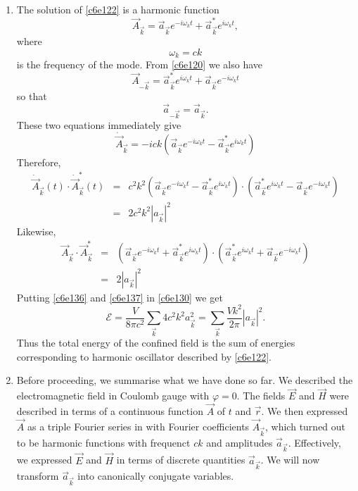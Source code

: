 \begin{enumerate}
\item The solution of \eqref{c6e122} is a harmonic function
\begin{equation}\label{c6e131}
\vec{A}_\vec{k} = \vec{a}_\vec{k}e^{-i\omega_k t} + \vec{a}_\vec{k}^\ast e^{i\omega_k t},
\end{equation}
where
\begin{equation}\label{c6e132}
\omega_k = ck
\end{equation}
is the frequency of the mode. From \eqref{c6e120} we also have
\begin{equation}\label{c6e133}
\vec{A}_{-\vec{k}} = \vec{a}_\vec{k}^\ast e^{i\omega_k t} + \vec{a}_\vec{k} e^{-i\omega_k t}
\end{equation}
so that
\begin{equation}\label{c6e134}
\vec{a}_{-\vec{k}} = \vec{a}_\vec{k}.
\end{equation}
These two equations immediately give
\begin{equation}\label{c6e135}
\dot{\vec{A}}_\vec{k} = -ick(\vec{a}_\vec{k}e^{-i\omega_k t} - \vec{a}_\vec{k}^\ast e^{i\omega_k t})
\end{equation}
Therefore,
\begin{eqnarray}
\dot{\vec{A}}_\vec{k}(t)\cdot\dot{\vec{A}}_{\vec{k}}^\ast(t) &=& c^2k^2
(\vec{a}_\vec{k}e^{-i\omega_k t} - \vec{a}_\vec{k}^\ast e^{i\omega_k t})\cdot
(\vec{a}_\vec{k}^\ast e^{i\omega_k t} - \vec{a}_\vec{k} e^{-i\omega_k t}) \nonumber \\
&=& 2c^2k^2|a_\vec{k}|^2 \label{c6e136}
\end{eqnarray}
Likewise,
\begin{eqnarray}
\vec{A}_\vec{k}\cdot\vec{A}_\vec{k}^\ast &=& 
(\vec{a}_\vec{k}e^{-i\omega_k t} + \vec{a}_\vec{k}^\ast e^{i\omega_k t})\cdot
(\vec{a}_\vec{k}^\ast e^{i\omega_k t} + \vec{a}_\vec{k} e^{-i\omega_k t}) \nonumber \\
&=& 2|a_\vec{k}|^2 \label{c6e137}
\end{eqnarray}
Putting \eqref{c6e136} and \eqref{c6e137} in \eqref{c6e130} we get
\begin{equation}\label{c6e138}
\mathcal{E} = \frac{V}{8\pi c^2}\sum_{\vec{k}} 4c^2k^2 a^2_\vec{k}
= \sum_{\vec{k}} \frac{Vk^2}{2\pi}|a_\vec{k}|^2.
\end{equation}
Thus the total energy of the confined field is the sum of energies corresponding
to harmonic oscillator described by \eqref{c6e122}.

\item Before proceeding, we summarise what we have done so far. We described the
electromagnetic field in Coulomb gauge with $\varphi = 0$. The fields $\vec{E}$ 
and $\vec{H}$ were described in terms of a continuous function $\vec{A}$ of $t$
and $\vec{r}$. We then expressed $\vec{A}$ as a triple Fourier series in with
Fourier coefficients $\vec{A}_\vec{k}$, which turned out to be harmonic functions
with frequenct $ck$ and amplitudes $\vec{a}_\vec{k}$. Effectively, we expressed
$\vec{E}$ and $\vec{H}$ in terms of discrete quantities $\vec{a}_\vec{k}$. We will
now transform $\vec{a}_\vec{k}$ into canonically conjugate variables.


\end{enumerate}
